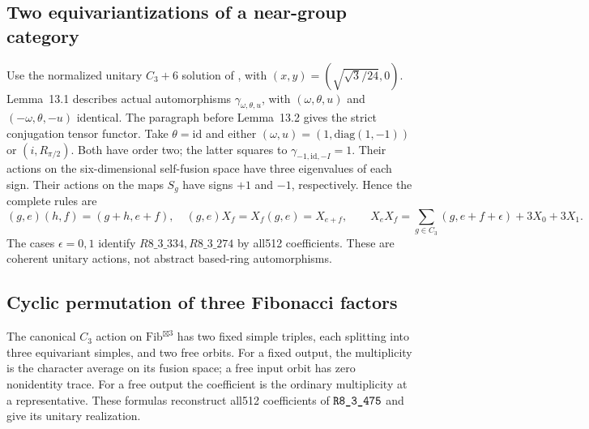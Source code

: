\subsection{Two equivariantizations of a near-group category}
Use the normalized unitary $C_3+6$ solution of \cite[Example~13.10]{IzumiNear}, with $(x,y)=(\sqrt{\sqrt3/24},0)$. Lemma~13.1 describes actual automorphisms $\gamma_{\omega,\theta,u}$, with $(\omega,\theta,u)$ and $(-\omega,\theta,-u)$ identical. The paragraph before Lemma~13.2 gives the strict conjugation tensor functor. Take $\theta=\mathrm{id}$ and either $(\omega,u)=(1,\mathrm{diag}(1,-1))$ or $(i,R_{\pi/2})$. Both have order two; the latter squares to $\gamma_{-1,\mathrm{id},-I}=1$. Their actions on the six-dimensional self-fusion space have three eigenvalues of each sign. Their actions on the maps $S_g$ have signs $+1$ and $-1$, respectively. Hence the complete rules are
\[
 (g,e)(h,f)=(g+h,e+f),\quad (g,e)X_f=X_f(g,e)=X_{e+f},
 \qquad X_eX_f=\sum_{g\in C_3}(g,e+f+\epsilon)+3X_0+3X_1.
\]
The cases $\epsilon=0,1$ identify $R8\_3\_334,R8\_3\_274$ by all512 coefficients. These are coherent unitary actions, not abstract based-ring automorphisms.

\subsection{Cyclic permutation of three Fibonacci factors}
The canonical $C_3$ action on $\mathrm{Fib}^{\boxtimes3}$ has two fixed simple triples, each splitting into three equivariant simples, and two free orbits. For a fixed output, the multiplicity is the character average on its fusion space; a free input orbit has zero nonidentity trace. For a free output the coefficient is the ordinary multiplicity at a representative. These formulas reconstruct all512 coefficients of $\sha{R8_3_475}$ and give its unitary realization.

